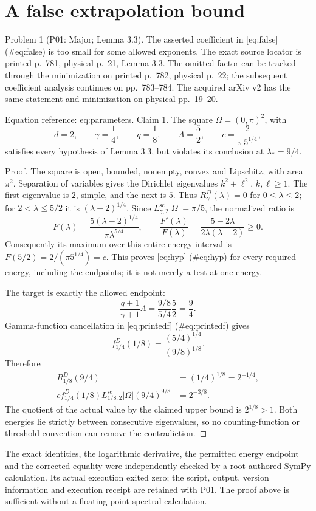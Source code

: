 \documentclass[10pt]{article}
\begin{document}
\section*{A false extrapolation bound}
Problem 1 (P01: Major; Lemma 3.3).  The asserted coefficient in [eq:false] (\#eq:false) is too small for some allowed exponents. The exact source locator is printed p. 781, physical p. 21, Lemma 3.3. The omitted factor can be tracked through the minimization on printed p. 782, physical p. 22; the subsequent coefficient analysis continues on pp. 783–784. The acquired arXiv v2 has the same statement and minimization on physical pp. 19–20.\par
Equation reference: eq:parameters. Claim 1.  The square \(\Omega=(0,\pi)^2\), with \[
 d=2,\qquad \gamma=\frac14,\qquad q=\frac18,\qquad
 \Lambda=\frac52,\qquad c=\frac{2}{\pi\,5^{1/4}},\] satisfies every hypothesis of Lemma 3.3, but violates its conclusion at \(\lambda_*=9/4\).\par
Proof. The square is open, bounded, nonempty, convex and Lipschitz, with area \(\pi^2\). Separation of variables gives the Dirichlet eigenvalues \(k^2+\ell^2\), \(k,\ell\geq1\). The first eigenvalue is \(2\), simple, and the next is \(5\). Thus \(R_\gamma^D(\lambda)=0\) for \(0\leq\lambda\leq2\); for \(2<\lambda\leq5/2\) it is \((\lambda-2)^{1/4}\). Since \(L^{\mathrm{sc}}_{\gamma,2}|\Omega|=\pi/5\), the normalized ratio is \[F(\lambda)=
 \frac{5(\lambda-2)^{1/4}}{\pi\lambda^{5/4}},
 \qquad
 \frac{F'(\lambda)}{F(\lambda)}
 =\frac{5-2\lambda}{2\lambda(\lambda-2)}\geq0.\] Consequently its maximum over this entire energy interval is \(F(5/2)=2/(\pi5^{1/4})=c\). This proves [eq:hyp] (\#eq:hyp) for every required energy, including the endpoints; it is not merely a test at one energy.\par
The target is exactly the allowed endpoint: \[\frac{q+1}{\gamma+1}\Lambda
 =\frac{9/8}{5/4}\frac52=\frac94.\] Gamma-function cancellation in [eq:printedf] (\#eq:printedf) gives \[f_{1/4}^D(1/8)
 =\frac{(5/4)^{1/4}}{(9/8)^{1/8}}.\] Therefore \[\begin{aligned}
 R_{1/8}^D(9/4)&=(1/4)^{1/8}=2^{-1/4},\\
 c f_{1/4}^D(1/8)L^{\mathrm{sc}}_{1/8,2}|\Omega|(9/4)^{9/8}
 &=2^{-3/8}.\end{aligned}\] The quotient of the actual value by the claimed upper bound is \(2^{1/8}>1\). Both energies lie strictly between consecutive eigenvalues, so no counting-function or threshold convention can remove the contradiction. ◻\par
The exact identities, the logarithmic derivative, the permitted energy endpoint and the corrected equality were independently checked by a root-authored SymPy calculation. Its actual execution exited zero; the script, output, version information and execution receipt are retained with P01. The proof above is sufficient without a floating-point spectral calculation.\par
\end{document}
